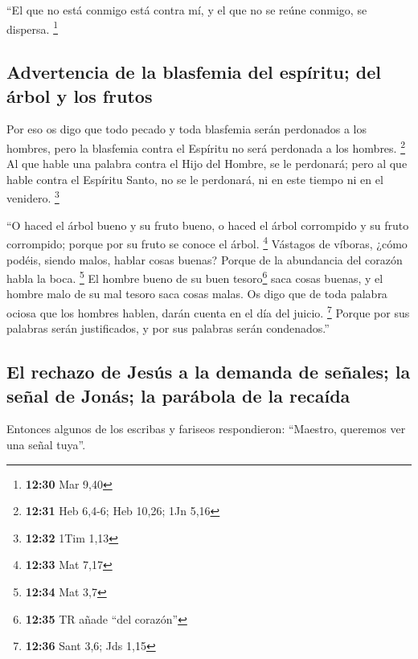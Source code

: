  ``El que no está conmigo está contra mí, y el que no se
reúne conmigo, se dispersa. \footnote{\textbf{12:30} Mar 9,40}

\hypertarget{advertencia-de-la-blasfemia-del-espuxedritu-del-uxe1rbol-y-los-frutos}{%
\subsection{Advertencia de la blasfemia del espíritu; del árbol y los
frutos}\label{advertencia-de-la-blasfemia-del-espuxedritu-del-uxe1rbol-y-los-frutos}}

 Por eso os digo que todo pecado y toda blasfemia serán
perdonados a los hombres, pero la blasfemia contra el Espíritu no será
perdonada a los hombres. \footnote{\textbf{12:31} Heb 6,4-6; Heb 10,26;
  1Jn 5,16}  Al que hable una palabra contra el Hijo del
Hombre, se le perdonará; pero al que hable contra el Espíritu Santo, no
se le perdonará, ni en este tiempo ni en el venidero. \footnote{\textbf{12:32}
  1Tim 1,13}

 ``O haced el árbol bueno y su fruto bueno, o haced el
árbol corrompido y su fruto corrompido; porque por su fruto se conoce el
árbol. \footnote{\textbf{12:33} Mat 7,17}  Vástagos de
víboras, ¿cómo podéis, siendo malos, hablar cosas buenas? Porque de la
abundancia del corazón habla la boca. \footnote{\textbf{12:34} Mat 3,7}
 El hombre bueno de su buen tesoro\footnote{\textbf{12:35}
  TR añade ``del corazón''} saca cosas buenas, y el hombre malo de su
mal tesoro saca cosas malas.  Os digo que de toda palabra
ociosa que los hombres hablen, darán cuenta en el día del juicio.
\footnote{\textbf{12:36} Sant 3,6; Jds 1,15}  Porque por
sus palabras serán justificados, y por sus palabras serán condenados.''

\hypertarget{el-rechazo-de-jesuxfas-a-la-demanda-de-seuxf1ales-la-seuxf1al-de-jonuxe1s-la-paruxe1bola-de-la-recauxedda}{%
\subsection{El rechazo de Jesús a la demanda de señales; la señal de
Jonás; la parábola de la
recaída}\label{el-rechazo-de-jesuxfas-a-la-demanda-de-seuxf1ales-la-seuxf1al-de-jonuxe1s-la-paruxe1bola-de-la-recauxedda}}

 Entonces algunos de los escribas y fariseos
respondieron: ``Maestro, queremos ver una señal tuya''.

